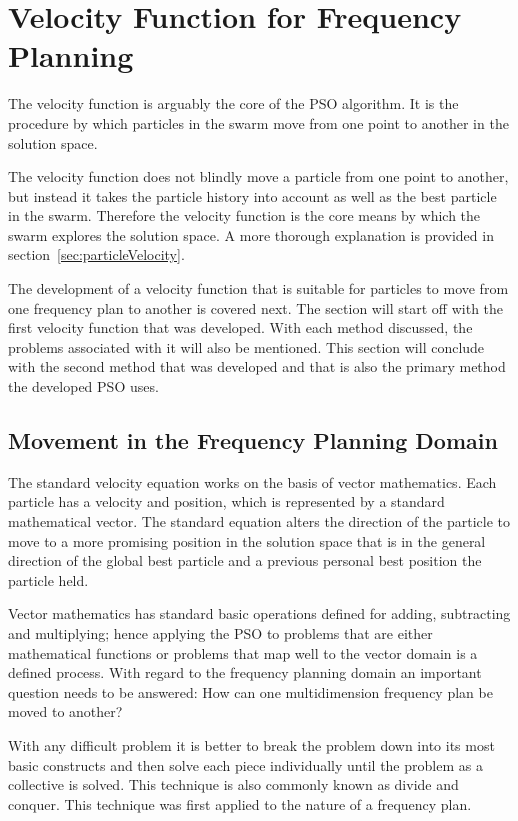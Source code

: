\section{Velocity Function for Frequency Planning}
\label{sec:velocityFAP}
The velocity function is arguably the core of the \gls{PSO} algorithm. It is the procedure by which particles in the swarm move from one point to another in the solution space. 

The velocity function does not blindly move a particle from one point to another, but instead it takes the particle history into account as well as the best particle in the swarm. Therefore the velocity function is the core means by which the swarm explores the solution space. A more thorough explanation is provided in section~\ref{sec:particleVelocity}.

The development of a velocity function that is suitable for particles to move from one frequency plan to another is covered next. The section will start off with the first velocity function that was developed. With each method discussed, the problems associated with it will also be mentioned. This section will conclude with the second method that was developed and that is also the primary method the developed \gls{PSO} uses.

\subsection{Movement in the Frequency Planning Domain}
\label{sec:velocityFAP1}
The standard velocity equation works on the basis of vector mathematics. Each particle has a velocity and position, which is represented by a standard mathematical vector. The standard equation alters the direction of the particle to move to a more promising position in the solution space that is in the general direction of the global best particle and a previous personal best position the particle held.

Vector mathematics has standard basic operations defined for adding, subtracting and multiplying; hence applying the \gls{PSO} to problems that are either mathematical functions or problems that map well to the vector domain is a defined process. With regard to the frequency planning domain an important question needs to be answered: How can one multidimension frequency plan be moved to another?

With any difficult problem it is better to break the problem down into its most basic constructs and then solve each piece individually until the problem as a collective is solved. This technique is also commonly known as divide and conquer. This technique was first applied to the nature of a frequency plan.

